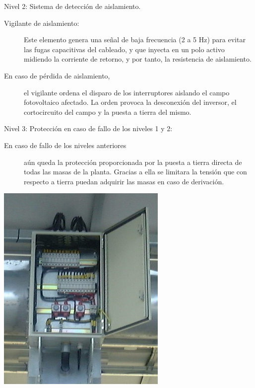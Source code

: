 \documentclass[xcolor={usenames,svgnames,dvipsnames}]{beamer}
\begin{document}
\begin{frame}[label=sec-5-1-3]{Nivel 2: Sistema de detección de aislamiento.}
\begin{description}
\item[{Vigilante de aislamiento:}] Este elemento genera una señal de baja
frecuencia (2 a 5 Hz) para evitar las fugas capacitivas del cableado,
y que inyecta en un polo activo midiendo la corriente de retorno, y
por tanto, la resistencia de aislamiento.

\item[{En caso de pérdida de aislamiento,}] el vigilante ordena el disparo
de los interruptores aislando el campo fotovoltaico afectado. La
orden provoca la desconexión del inversor, el cortocircuito del campo
y la puesta a tierra del mismo.
\end{description}
\end{frame}

\begin{frame}[label=sec-5-1-4]{Nivel 3: Protección en caso de fallo de los niveles 1 y 2:}
\begin{description}
\item[{En caso de fallo de los niveles anteriores}] aún queda la protección
proporcionada por la puesta a tierra directa de todas las masas de la
planta. Gracias a ella se limitara la tensión que con respecto a
tierra puedan adquirir las masas en caso de derivación.
\end{description}
\end{frame}

\begin{frame}[label=sec-5-1-5]{}
\includegraphics[height=0.8\textheight]{../figs/CajaDC.jpg}
\end{frame}
\end{document}
